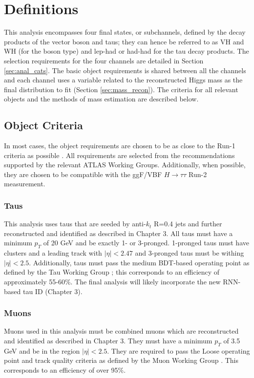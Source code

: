 \section{Definitions}
This analysis encompasses four final states, or subchannels, defined by the decay products of the vector boson and taus; they can hence be referred to as VH and WH (for the boson type) and lep-had or had-had for the tau decay products. The selection requirements for the four channels are detailed in Section \ref{sec:anal_cats}. The basic object requirements is shared between all the channels and each channel uses a variable related to the reconstructed Higgs mass as the final distribution to fit (Section \ref{sec:mass_recon}). The criteria for all relevant objects and the methods of mass estimation are described below. 

\subsection{Object Criteria}
In most cases, the object requirements are chosen to be as close to the Run-1 criteria as possible \cite{vh_run1_note}. All requirements are selected from the recommendations supported by the relevant ATLAS Working Groups. Additionally, when possible, they are chosen to be compatible with the ggF/VBF $H\rightarrow\tau\tau$ Run-2 measurement. 

\subsubsection{Taus}
This analysis uses taus that are seeded by anti-$k_t$ R=0.4 jets and further reconstructed and identified as described in Chapter 3. All taus must have a minimum $p_T$ of 20 GeV and be exactly 1- or 3-pronged. 1-pronged taus must have clusters and a leading track with $|\eta|<2.47$ and 3-pronged taus must be withing $|\eta|<2.5$. Additionally, taus must pass the medium BDT-based operating point as defined by the Tau Working Group \cite{tau_cp}; this corresponds to an efficiency of approximately 55-60\%. The final analysis will likely incorporate the new RNN-based tau ID (Chapter 3).

\subsubsection{Muons}
Muons used in this analysis must be combined muons which are reconstructed and identified as described in Chapter 3. They must have a minimum $p_T$ of 3.5 GeV and be in the region $|\eta|<2.5$. They are required to pass the Loose operating point and track quality criteria as defined by the Muon Working Group \cite{muon_cp}. This corresponds to an efficiency of over 95\%.

